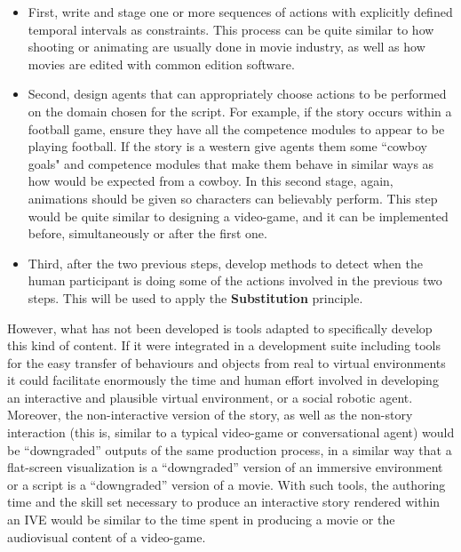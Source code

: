 \documentclass[
		twoside,openright,titlepage,numbers=noenddot,manychapters,
		headinclude,%
                footinclude=false,cleardoublepage=empty,
                BCOR=5mm,
		fontsize=11pt, %
                 enabledeprecatedfontcommands]{scrreprt}
\begin{document}
\begin{itemize}
\item First, write and stage one or more sequences of actions with explicitly defined temporal intervals as constraints. This process can be quite similar to how shooting or animating are usually done in movie industry, as well as how movies are edited with common edition software. %

\item Second, design agents that can appropriately choose actions to be performed on the domain chosen for the script. For example, if the story occurs within a football game, ensure they have all the competence modules to appear to be playing football. If the story is a western give agents them some ``cowboy goals" and competence modules that make them behave in similar ways as how would be expected from a cowboy. In this second stage, again, animations should be given so characters can believably perform. This step would be quite similar to designing a video-game, and it can be implemented before, simultaneously or after the first one.

\item Third, after the two previous steps, develop methods to detect when the human participant is doing some of the actions involved in the previous two steps. This will be used to apply the \textbf{Substitution} principle.
\end{itemize}

However, what has not been developed is tools adapted to specifically develop this kind of content. 
If it were integrated in a development suite including tools for the easy transfer of behaviours and objects from real to virtual environments it could facilitate enormously the time and human effort involved in developing an interactive and plausible virtual environment, or a social robotic agent. Moreover, the non-interactive version of the story, as well as the non-story interaction (this is, similar to a typical video-game or conversational agent) would be ``downgraded'' outputs of the same production process, in a similar way that a flat-screen visualization is a ``downgraded'' version of an immersive environment or a script is a ``downgraded'' version of a movie.  With such tools, the authoring time and the skill set necessary to produce an interactive story rendered within an IVE would be similar to the time spent in producing a movie or the audiovisual content of a video-game.
\end{document}
